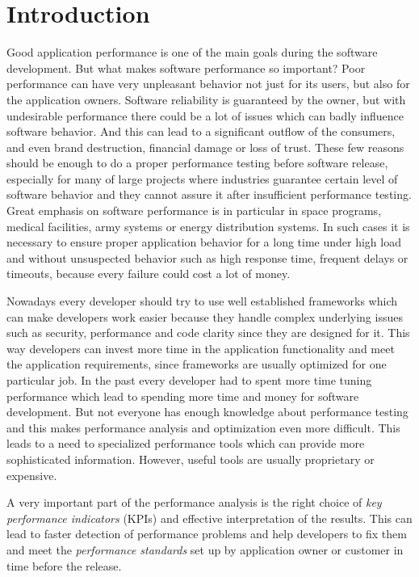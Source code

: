\chapter{Introduction}
\label{Introduction}
Good application performance is one of the main goals during the software development. But what makes software performance so important? Poor performance can have very unpleasant behavior not just for its users, but also for the application owners. Software reliability is guaranteed by the owner, but with undesirable performance there could be a lot of issues which can badly influence software behavior. And this can lead to a significant outflow of the consumers, and even brand destruction, financial damage or loss of trust. These few reasons should be enough to do a proper performance testing before software release, especially for many of large projects where industries guarantee certain level of software behavior and they cannot assure it after insufficient performance testing. Great emphasis on software performance is in particular in space programs, medical facilities, army systems or energy distribution systems. In such cases it is necessary to ensure proper application behavior for a long time under high load and without unsuspected behavior such as high response time, frequent delays or timeouts, because every failure could cost a lot of money. 

Nowadays every developer should try to use well established frameworks which can make developers work easier because they handle complex underlying issues such as security, performance and code clarity since they are designed for it. This way developers can invest more time in the application functionality and meet the application requirements, since frameworks are usually optimized for one particular job. In the past every developer had to spent more time tuning performance which lead to spending more time and money for software development. But not everyone has enough knowledge about performance testing and this makes performance analysis and optimization even more difficult. This leads to a need to specialized performance tools which can provide more sophisticated information. However, useful tools are usually proprietary or expensive.

A very important part of the performance analysis is the right choice of \emph{key performance indicators} (KPIs) \cite{Molyneaux:TAoAPT} and effective interpretation of the results. This can lead to faster detection of performance problems and help developers to fix them and meet the \emph{performance standards} \cite{Molyneaux:TAoAPT} set up by application owner or customer in time before the release. 

